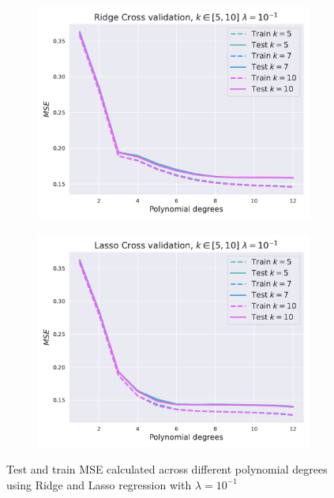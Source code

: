 \documentclass[twocolumn,english,notitlepage]{article}
\begin{document}
        \begin{figure}[ht]
            \begin{subfigure}{.9\linewidth}
                \centering
                \includegraphics[width=.9\linewidth]{bad_lmbda_Ridge_mse_kfold.pdf}
            \end{subfigure}
            \hfill
            \begin{subfigure}{.9\linewidth}
                \centering
                \includegraphics[width=.9\linewidth]{bad_lmbda_Lasso_mse_kfold.pdf}
            \end{subfigure}
            \caption{Test and train MSE calculated across different polynomial degrees using Ridge and Lasso regression with $\lambda = 10^{-1}$}
            \label{res:fig:ridgelasso_cv_badlambda}
        \end{figure}
\end{document}
